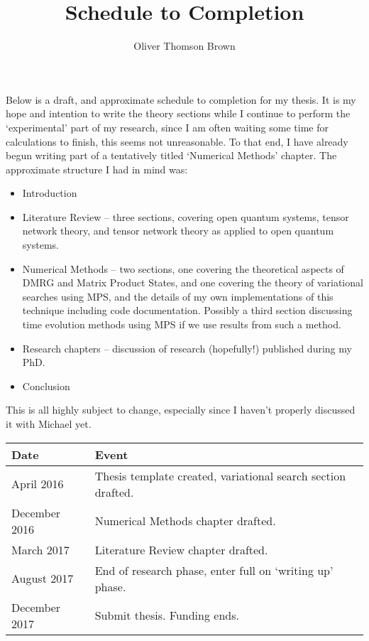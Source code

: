 \documentclass[a4paper,twoside,11pt]{article}
\author{Oliver Thomson Brown}
\title{Schedule to Completion}
\begin{document}
\maketitle

Below is a draft, and approximate schedule to completion for my thesis. It is my hope and intention to write the theory sections while I continue to perform the `experimental' part of my research, since I am often waiting some time for calculations to finish, this seems not unreasonable. To that end, I have already begun writing part of a tentatively titled `Numerical Methods' chapter. The approximate structure I had in mind was:
\begin{itemize}
\item Introduction
\item Literature Review -- three sections, covering open quantum systems, tensor network theory, and tensor network theory as applied to open quantum systems.
\item Numerical Methods -- two sections, one covering the theoretical aspects of DMRG and Matrix Product States, and one covering the theory of variational searches using MPS, and the details of my own implementations of this technique including code documentation. Possibly a third section discussing time evolution methods using MPS if we use results from such a method.
\item Research chapters -- discussion of research (hopefully!) published during my PhD.
\item Conclusion
\end{itemize}

This is all highly subject to change, especially since I haven't properly discussed it with Michael yet.

\begin{longtabu}{X[1,c]X[4,l]}
\hline
Date & Event \\ \hline
April 2016 & Thesis template created, variational search section drafted. \\
December 2016 & Numerical Methods chapter drafted. \\
March 2017 & Literature Review chapter drafted. \\
August 2017 & End of research phase, enter full on `writing up' phase. \\
December 2017 & Submit thesis. Funding ends. \\
\hline
\end{longtabu}
\end{document}
